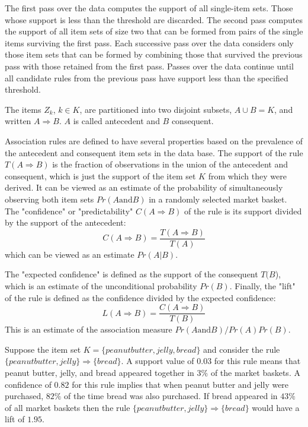 The first pass over the data computes the support of all single-item sets. Those whose support is less than the threshold are discarded. The second pass computes the support of all item sets of size two that can be formed from pairs of the single items surviving the first pass. Each successive pass over the data considers only those item sets that can be formed by combining those that survived the previous pass with those retained from the first pass. Passes over the data continue until all candidate rules from the previous pass have support less than the specified threshold.

The items $Z_k$, $k \in K$, are partitioned into two disjoint subsets, $A \cup B = K$, and written $A\Rightarrow B$. $A$ is called antecedent and $B$ consequent.

Association rules are defined to have several properties based on the prevalence of the antecedent and consequent item sets in the data base. The support of the rule $T(A\Rightarrow B)$ is the fraction of observations in the union of the antecedent and consequent, which is just the support of the item set $K$ from which they were derived. It can be viewed as an estimate of the probability of simultaneously observing both item sets $Pr(A \text{and} B)$ in a randomly selected market basket. The "confidence" or "predictability" $C(A\Rightarrow B)$ of the rule is its support divided by the support of the antecedent:
\begin{equation}
C(A\Rightarrow B) = \frac{T(A\Rightarrow B)}{T(A)}
\end{equation}
which can be viewed as an estimate $Pr(A|B)$.

The "expected confidence" is defined as the support of the consequent $T(B$), which is an estimate of the unconditional probability $Pr(B)$. Finally, the "lift" of the rule is defined as the confidence divided by the expected confidence:
\begin{equation}
L(A\Rightarrow B) = \frac{C(A\Rightarrow B)}{T(B)}
\end{equation}
This is an estimate of the association measure $Pr(A \text{and} B)/Pr(A)Pr(B)$.

Suppose the item set $K = \{peanut butter, jelly, bread\}$ and consider the rule $\{peanut butter, jelly\} \Rightarrow \{bread\}$. A support value of $0.03$ for this rule means that peanut butter, jelly, and bread appeared together in $3\%$ of the market baskets. A confidence of $0.82$ for this rule implies that when peanut butter and jelly were purchased, $82\%$ of the time bread was also purchased. If bread appeared in $43\%$ of all market baskets then the rule $\{peanut butter, jelly\} \Rightarrow \{bread\}$ would have a lift of $1.95$.

